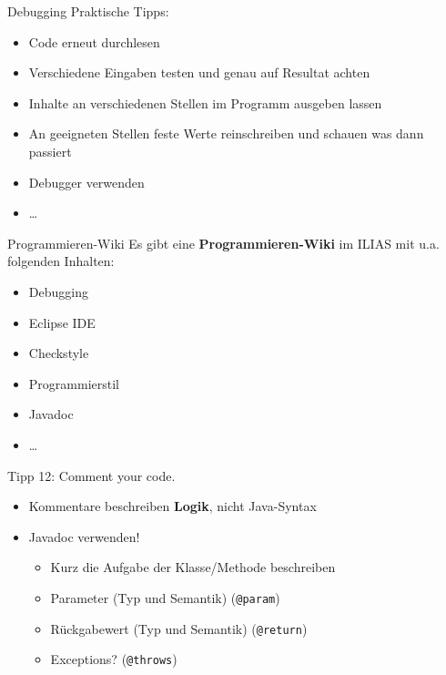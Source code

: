 \documentclass[18pt]{beamer}
\begin{document}
\begin{frame}{Debugging}
    Praktische Tipps:
    \begin{itemize}
        \item Code erneut durchlesen
        \item Verschiedene Eingaben testen und genau auf Resultat achten
        \item Inhalte an verschiedenen Stellen im Programm ausgeben lassen
        \item An geeigneten Stellen feste Werte reinschreiben und schauen was dann passiert
        \item Debugger verwenden
        \item \dots
    \end{itemize}
\end{frame}

\begin{frame}{Programmieren-Wiki}
    Es gibt eine \textbf{Programmieren-Wiki} im ILIAS mit u.a. folgenden Inhalten:

    \begin{itemize}
        \item Debugging
        \item Eclipse IDE
        \item Checkstyle
        \item Programmierstil
        \item Javadoc
        \item \dots
    \end{itemize}
\end{frame}

\begin{frame}{Tipp 12: Comment your code.}
    \begin{itemize}
        \item Kommentare beschreiben \textbf{Logik}, nicht Java-Syntax
        \item Javadoc verwenden!
        \begin{itemize}
            \item Kurz die Aufgabe der Klasse/Methode beschreiben
            \item Parameter (Typ und Semantik) (\texttt{@param})
            \item Rückgabewert (Typ und Semantik) (\texttt{@return})
            \item Exceptions? (\texttt{@throws})
        \end{itemize}
    \end{itemize}
\end{frame}
\end{document}
